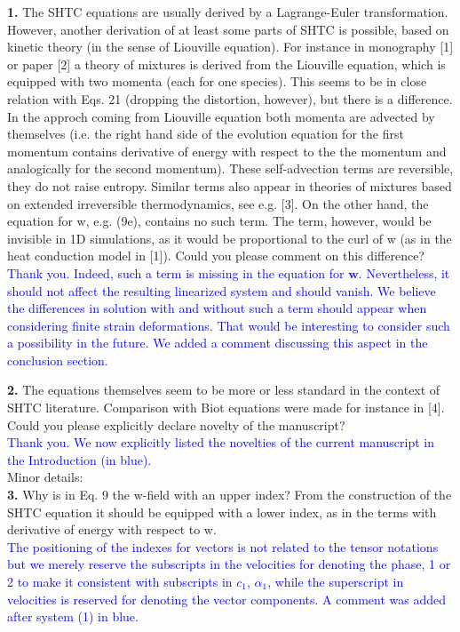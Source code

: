 \documentclass[3p,times,table]{article}
\newcommand{\ww}{{\bm{w}}}
\newcommand{\revThree}[1]{\textcolor{Blue}{#1}}
\begin{document}
\textbf{1.} The SHTC equations are usually derived by a 
Lagrange-Euler transformation. However, 
another 
derivation of at least some parts of SHTC is possible, based on kinetic theory (in the sense of 
Liouville equation). For instance in monography [1] or paper [2] a theory of mixtures is derived 
from the Liouville equation, which is equipped with two momenta (each for one species). This seems 
to be in close relation with Eqs. 21 (dropping the distortion, however), but there is a difference. 
In the approch coming from Liouville equation both momenta are advected by themselves (i.e. the 
right hand side of the evolution equation for the first momentum contains derivative of energy with 
respect to the the momentum and analogically for the second momentum). These self-advection terms 
are reversible, they do not raise entropy. Similar terms also appear in theories of mixtures based 
on extended irreversible thermodynamics, see e.g. [3]. On the other hand, the equation for w, e.g. 
(9e),
contains no such term. The term, however, would be invisible in 1D simulations, as it would be 
proportional to the curl of w (as in the heat conduction model in [1]). Could you please comment on 
this difference?
\\
\revThree{Thank you. Indeed, such a term is missing in the equation 
for $ \ww $. Nevertheless, it should not affect the resulting 
linearized system and should vanish. We believe the differences in 
solution with and without such a term should appear when considering 
finite strain deformations. That would be interesting to consider 
such a possibility in the future. We added a comment discussing this 
aspect in the conclusion section.}

\textbf{2.} The equations themselves seem to be more or less standard in the context of SHTC 
literature. 
Comparison with Biot equations were made for instance in [4]. Could you please explicitly declare 
novelty of the manuscript?
\\
\revThree
{Thank you. We now explicitly listed the novelties of the 
current 
manuscript in the Introduction (in blue).}
\\

Minor details:\\

\textbf{3.} Why is in Eq. 9 the w-field with an upper index? From 
the construction of the SHTC 
equation it 
should be equipped with a lower index, as in the terms with 
derivative of energy with respect to w.
\\
\revThree{The positioning of the indexes for vectors is not related 
to the tensor notations but we merely reserve the subscripts in the 
velocities for denoting the phase, 1 or 2 to make it consistent with 
subscripts in $ c_1 $, $ \alpha_1 $, while the superscript in 
velocities is 
reserved for denoting the vector components. A comment was added 
after system (1) in blue.}
\\
\end{document}

